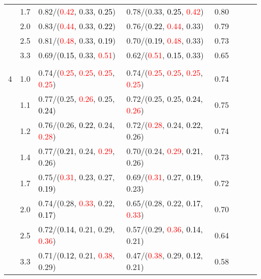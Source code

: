 \documentclass[10pt,a4paper]{report}
\begin{document}
\begin{table}[!htbp]
\begin{center}
{\begin{tabular}{ccllcccc}
			&1.7&0.82/(\textcolor{red}{0.42}, 0.33, \textcolor{black}{0.25})&0.78/(0.33, \textcolor{black}{0.25}, \textcolor{red}{0.42})&0.80\\
			&2.0&0.83/(\textcolor{red}{0.44}, 0.33, \textcolor{black}{0.22})&0.76/(\textcolor{black}{0.22}, \textcolor{red}{0.44}, 0.33)&0.79\\
			&2.5&0.81/(\textcolor{red}{0.48}, 0.33, \textcolor{black}{0.19})&0.70/(\textcolor{black}{0.19}, \textcolor{red}{0.48}, 0.33)&0.73\\
			&3.3&0.69/(\textcolor{black}{0.15}, 0.33, \textcolor{red}{0.51})&0.62/(\textcolor{red}{0.51}, \textcolor{black}{0.15}, 0.33)&0.65\\
			&&&&\\
			4			&1.0&0.74/(\textcolor{red}{0.25}, \textcolor{red}{0.25}, \textcolor{red}{0.25}, \textcolor{red}{0.25})&0.74/(\textcolor{red}{0.25}, \textcolor{red}{0.25}, \textcolor{red}{0.25}, \textcolor{red}{0.25})&0.74\\
			&1.1&0.77/(0.25, \textcolor{red}{0.26}, 0.25, \textcolor{black}{0.24})&0.72/(0.25, 0.25, \textcolor{black}{0.24}, \textcolor{red}{0.26})&0.75\\
			&1.2&0.76/(0.26, \textcolor{black}{0.22}, 0.24, \textcolor{red}{0.28})&0.72/(\textcolor{red}{0.28}, 0.24, \textcolor{black}{0.22}, 0.26)&0.74\\
			&1.4&0.77/(\textcolor{black}{0.21}, 0.24, \textcolor{red}{0.29}, 0.26)&0.70/(0.24, \textcolor{red}{0.29}, \textcolor{black}{0.21}, 0.26)&0.73\\
			&1.7&0.75/(\textcolor{red}{0.31}, 0.23, 0.27, \textcolor{black}{0.19})&0.69/(\textcolor{red}{0.31}, 0.27, \textcolor{black}{0.19}, 0.23)&0.72\\
			&2.0&0.74/(0.28, \textcolor{red}{0.33}, 0.22, \textcolor{black}{0.17})&0.65/(0.28, 0.22, \textcolor{black}{0.17}, \textcolor{red}{0.33})&0.70\\
			&2.5&0.72/(\textcolor{black}{0.14}, 0.21, 0.29, \textcolor{red}{0.36})&0.57/(0.29, \textcolor{red}{0.36}, \textcolor{black}{0.14}, 0.21)&0.64\\
			&3.3&0.71/(\textcolor{black}{0.12}, 0.21, \textcolor{red}{0.38}, 0.29)&0.47/(\textcolor{red}{0.38}, 0.29, \textcolor{black}{0.12}, 0.21)&0.58\\
			\bottomrule
		\end{tabular}}
	\end{center}
\end{table}
\end{document}
